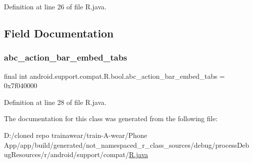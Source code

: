Definition at line 26 of file R.\+java.


\begin{DoxyCode}{0}

\end{DoxyCode}


\subsection{Field Documentation}
\mbox{\label{classandroid_1_1support_1_1compat_1_1_r_1_1bool_a2b1c86504041f2552ac19b7856b668f0}} 
\subsubsection{\texorpdfstring{abc\_action\_bar\_embed\_tabs}{abc\_action\_bar\_embed\_tabs}}
{\footnotesize\ttfamily final int android.\+support.\+compat.\+R.\+bool.\+abc\+\_\+action\+\_\+bar\+\_\+embed\+\_\+tabs = 0x7f040000\hspace{0.3cm}{\ttfamily [static]}}



Definition at line 28 of file R.\+java.



The documentation for this class was generated from the following file\+:\begin{DoxyCompactItemize}
\item 
D\+:/cloned repo trainawear/train-\/\+A-\/wear/\+Phone App/app/build/generated/not\+\_\+namespaced\+\_\+r\+\_\+class\+\_\+sources/debug/process\+Debug\+Resources/r/android/support/compat/\mbox{\hyperlink{process_debug_resources_2r_2android_2support_2compat_2_r_8java}{R.\+java}}\end{DoxyCompactItemize}
